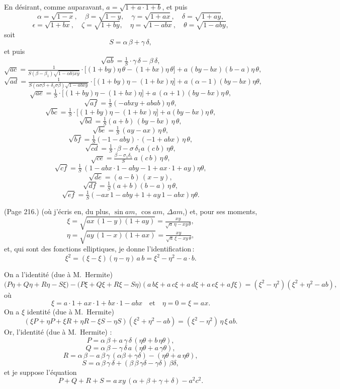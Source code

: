 \documentclass[11pt,a4paper]{book}
\begin{document}
En d\'esirant, comme auparavant, $a = \sqrt{1 + a\cdot 1 + b}$, et puis
\[
\alpha = \sqrt{1 - x}, \quad \beta = \sqrt{1 - y}, \quad \gamma = \sqrt{1 + a x}, \quad \delta = \sqrt{1 + a y},
\]
\[
\epsilon = \sqrt{1 + b x}, \quad \zeta = \sqrt{1 + b y}, \quad \eta = \sqrt{1 - abx}, \quad \theta = \sqrt{1 - aby},
\]
soit
\[
S = \alpha\,\beta + \gamma\,\delta,
\]
et puis
\[
\sqrt{a b} = \tfrac{1}{S} \cdot \gamma\,\delta - \beta\,\delta,
\]
\[
\sqrt{a c} = \tfrac{1}{S(\beta - \beta_1)\sqrt{1 - \alpha b)x y}} \cdot \big[(1 + by)\eta\,\theta - (1 + b x)\eta\,\theta\big] + a\,(b y - b x)(b - a)\eta\,\theta,
\]
\[
\sqrt{a d} = \tfrac{1}{S(\alpha\sigma\beta + \delta_1\sigma\beta)\sqrt{1 - abx y}} \cdot \big[(1 + by)\eta - (1 + b x)\eta\big] + a\,(\alpha - 1)(b y - b x)\eta\theta,
\]
\[
\sqrt{a e} = \tfrac{1}{S} \cdot \big[(1 + by)\eta - (1 + b x)\eta\big] + a\,(\alpha + 1)(b y - b x)\eta\,\theta,
\]
\[
\sqrt{a f} = \tfrac{1}{S} (- a b x y + a b a b)\eta\,\theta,
\]
\[
\sqrt{b c} = \tfrac{1}{S} \cdot \big[(1 + by)\eta - (1 + b x)\eta\big] + a (b y - b x) \eta\,\theta,
\]
\[
\sqrt{b d} = \tfrac{1}{S} (a + b)\,(b y - b x)\,\eta\,\theta,
\]
\[
\sqrt{b e} = \tfrac{1}{S}\,(a y - a x)\,\eta\,\theta,
\]
\[
\sqrt{b f} = \tfrac{1}{S} (- 1 - a b y) \cdot (- 1 + a b x)\,\eta\,\theta,
\]
\[
\sqrt{c d} = \tfrac{1}{S} \cdot \beta - \sigma\,\delta_1 a\,(c\,b)\,\eta\theta,
\]
\[
\sqrt{c e} = \tfrac{\beta - \sigma_1\delta_1}{S}\,a\,(c\,b)\,\eta\,\theta,
\]
\[
\sqrt{c f} = \tfrac{1}{S}\,(1 - a b x\cdot 1 - a b y - 1 + a x\cdot 1 + a y)\eta\theta,
\]
\[
\sqrt{d e} = (a - b)\,(x - y),
\]
\[
\sqrt{d f} = \tfrac{1}{S} (a + b)(b - a)\,\eta\,\theta,
\]
\[
\sqrt{e f} = \tfrac{1}{S}(- a x\,1 - a b y + 1 + a y\,1 - a b x)\eta\theta.
\]

\medskip

\noindent (Page 216.) (o\`u j'\'ecris en, du plus, $\sin am$, $\cos am$, $\Delta am$,) et, pour ses moments,
\[
\xi = \sqrt{ax\,(1 - y)(1 + ay)} = \tfrac{x y}{\sqrt{a}\,\eta - x y\,\theta},
\]
\[
\eta = \sqrt{a y\,(1 - x)(1 + ax)} = \tfrac{x y}{\sqrt{a}\,\xi - x y\,\theta},
\]
et, qui sont des fonctions elliptiques, je donne l'identification\,:
\[
\xi^2 = (\xi - \xi)(\eta - \eta)\,a\,b = \xi^2 - \eta^2 - a \cdot b.
\]

On a l'identit\'e (due \`a M.~Hermite)
\[
\big(P\eta + Q\eta + R \eta - S\xi\big) - \big(P\xi + Q\xi + R\xi - S\eta\big) (a\,b\xi + a\,c\xi + a\,d\xi + a\,e\xi + a f\xi) = (\xi^2 - \eta^2)(\xi^2 + \eta^2 - a b),
\]
o\`u
\[
\xi = a \cdot 1 + a x \cdot 1 + b x \cdot 1 - a b x \quad \text{et} \quad \eta = 0 = \xi = a x.
\]
On a $\xi$ identit\'e (due \`a M.~Hermite)
\[
(\xi P + \eta P + \xi R + \eta R - \xi S - \eta S)(\xi^2 + \eta^2 - a b) = (\xi^2 - \eta^2)\,\eta\,\xi\,a b.
\]
Or, l'identit\'e (due \`a M.~Hermite) :
\[
P = \alpha\,\beta + a\,\gamma\,\delta\,(\eta\theta + b\,\eta\theta),
\]
\[
Q = \alpha\,\beta - \gamma\,\delta\,a\,(\eta\theta + a\,\gamma\theta),
\]
\[
R = \alpha\,\beta - a\,\beta\,\gamma\,(\alpha\beta + \gamma\delta) - (\eta\theta + a\,\eta\theta),
\]
\[
S = \alpha\,\beta\,\gamma\,\delta + (\beta\,\beta\,\gamma\delta - \gamma\delta)\,\beta\delta,
\]
et je suppose l'\'equation
\[
P + Q + R + S = a\,xy\,(\alpha + \beta + \gamma + \delta) - a^2 c^2.
\]
\end{document}
